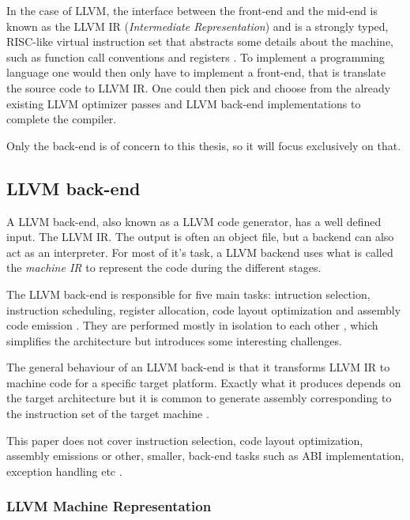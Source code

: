 In the case of LLVM, the interface between the front-end and the mid-end is known as the
LLVM IR (\textit{Intermediate Representation}) and is a strongly typed, RISC-like virtual
instruction set that abstracts some details about the machine, such as function call
conventions and registers \cite[Section~11.3]{aosa-llvm}. To implement a programming language
one would then only have to implement a front-end, that is translate the source code to
LLVM IR. One could then pick and choose from the already existing LLVM optimizer passes
and LLVM back-end implementations to complete the compiler\cite[Section~11.5]{aosa-llvm}.

Only the back-end is of concern to this thesis, so it will focus exclusively on that.

\subsection{LLVM back-end}

A LLVM back-end, also known as a LLVM code generator, has a well defined input. The
LLVM IR\cite[Section~11.4.1]{aosa-llvm}. The output is often an object file, but a backend
can also act as an interpreter. For most of it's task, a LLVM backend uses what is called
the \textit{machine IR} to represent the code during the different stages.

The LLVM back-end is responsible for five main tasks: intruction selection, instruction
scheduling, register allocation, code layout optimization and assembly code emission
\cite{llvm-writing-backend, llvm-codegenerator-highlevel, aosa-llvm}. They are performed
mostly in isolation to each other \cite[Section~11.5]{aosa-llvm}, which simplifies the
architecture but introduces some interesting challenges.

The general behaviour of an LLVM back-end is that it transforms LLVM IR to machine code
for a specific target platform. Exactly what it produces depends on the target architecture
but it is common to generate assembly corresponding to the instruction set of the target
machine \cite[Section~11.5]{aosa-llvm}.

This paper does not cover instruction selection, code layout optimization, assembly emissions
or other, smaller, back-end tasks such as ABI implementation, exception handling etc
\cite[at~1:47]{welcome-to-backend}.

\subsubsection{LLVM Machine Representation}

